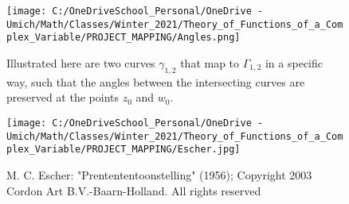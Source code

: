 \documentclass[a4paper,man,natbib]{apa6}
\begin{document}
\begin{figure}

      \centering
      \texttt{[image: C:/OneDriveSchool\_Personal/OneDrive - Umich/Math/Classes/Winter\_2021/Theory\_of\_Functions\_of\_a\_Complex\_Variable/PROJECT\_MAPPING/Angles.png]}
      \caption{\label{C:/OneDriveSchool_Personal/OneDrive - Umich/Math/Classes/Winter_2021/Theory_of_Functions_of_a_Complex_Variable/PROJECT_MAPPING/Angles.png}
      Illustrated here are two curves $ \gamma_{1,2} $ that map to $ \Gamma_{1,2} $ in a specific way, 
      such that the angles between the intersecting curves are preserved at the points $ z_0 $ and $ w_0 $.}

\end{figure}

\begin{figure}

      \centering
      \texttt{[image: C:/OneDriveSchool\_Personal/OneDrive - Umich/Math/Classes/Winter\_2021/Theory\_of\_Functions\_of\_a\_Complex\_Variable/PROJECT\_MAPPING/Escher.jpg]}
      \caption{\label{C:/OneDriveSchool_Personal/OneDrive - Umich/Math/Classes/Winter_2021/Theory_of_Functions_of_a_Complex_Variable/PROJECT_MAPPING/Escher.jpg}
      M. C. Escher: "Prentententoonstelling" (1956); Copyright 2003 Cordon Art B.V.-Baarn-Holland. All rights reserved}

\end{figure}
\end{document}
